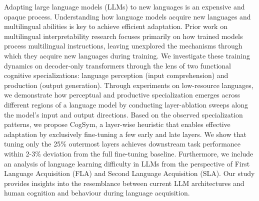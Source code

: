 Adapting large language models (LLMs) to new languages is an expensive and opaque process. Understanding how language models acquire new languages and multilingual abilities is key to achieve efficient adaptation. Prior work on multilingual interpretability research focuses primarily on how trained models process multilingual instructions, leaving unexplored the mechanisms through which they acquire new languages during training. We investigate these training dynamics on decoder-only transformers through the lens of two functional cognitive specializations: language perception (input comprehension) and production (output generation). Through experiments on low-resource languages, we demonstrate how perceptual and productive specialization emerges across different regions of a language model by conducting layer-ablation sweeps along the model's input and output directions. Based on the observed specialization patterns, we propose CogSym, a layer-wise heuristic that enables effective adaptation by exclusively fine-tuning a few early and late layers. We show that tuning only the 25\% outermost layers achieves downstream task performance within 2-3\% deviation from the full fine-tuning baseline. Furthermore, we include an analysis of language learning difficulty in LLMs from the perspective of First Language Acquisition (FLA) and Second Language Acquisition (SLA). Our study provides insights into the resemblance between current LLM architectures and human cognition and behaviour during language acquisition.

